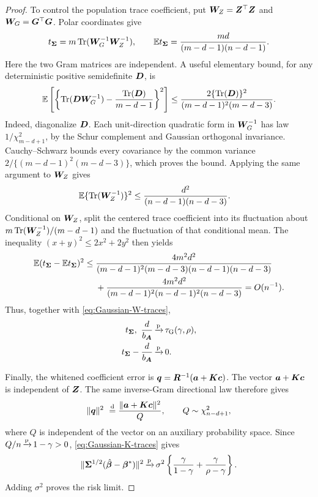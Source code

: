 \documentclass{article}
\theoremstyle{plain} %
\theoremstyle{definition} %
\theoremstyle{definition} %
\begin{document}
\begin{proof}
To control the population trace coefficient, put
$\boldsymbol{W}_Z=\boldsymbol{Z}^\top\boldsymbol{Z}$ and $\boldsymbol{W}_G=\boldsymbol{G}^\top\boldsymbol{G}$. Polar coordinates give
\begin{align*}
    t_{\boldsymbol{\Sigma}}=m\operatorname{Tr}(\boldsymbol{W}_G^{-1}\boldsymbol{W}_Z^{-1}),
    \qquad
    {\mathbb{E}} t_{\boldsymbol{\Sigma}}=\frac{md}{(m-d-1)(n-d-1)}.
\end{align*}
Here the two Gram matrices are independent. A useful elementary bound,
for any deterministic positive semidefinite $\boldsymbol{D}$, is
\begin{align*}
    {\mathbb{E}}\left[
      \left\{\operatorname{Tr}(\boldsymbol{D}\boldsymbol{W}_G^{-1})-
             \frac{\operatorname{Tr}(\boldsymbol{D})}{m-d-1}\right\}^2\right]
    \leq\frac{2\{\operatorname{Tr}(\boldsymbol{D})\}^2}{(m-d-1)^2(m-d-3)}.
\end{align*}
Indeed, diagonalize $\boldsymbol{D}$. Each unit-direction quadratic form in
$\boldsymbol{W}_G^{-1}$ has law $1/\chi^2_{m-d+1}$, by the Schur complement and
Gaussian orthogonal invariance. Cauchy--Schwarz bounds every covariance
by the common variance $2/\{(m-d-1)^2(m-d-3)\}$, which proves the bound.
Applying the same argument to $\boldsymbol{W}_Z$ gives
\begin{align*}
    {\mathbb{E}}\{\operatorname{Tr}(\boldsymbol{W}_Z^{-1})\}^2
       &\leq\frac{d^2}{(n-d-1)(n-d-3)}.
\end{align*}
Conditional on $\boldsymbol{W}_Z$, split the centered trace coefficient into
its fluctuation about $m\operatorname{Tr}(\boldsymbol{W}_Z^{-1})/(m-d-1)$ and the fluctuation
of that conditional mean. The inequality $(x+y)^2\leq2x^2+2y^2$ then yields
\begin{align*}
    {\mathbb{E}}(t_{\boldsymbol{\Sigma}}-{\mathbb{E}} t_{\boldsymbol{\Sigma}})^2
    \leq{}&
    \frac{4m^2d^2}
    {(m-d-1)^2(m-d-3)(n-d-1)(n-d-3)}\\
    &+\frac{4m^2d^2}
    {(m-d-1)^2(n-d-1)^2(n-d-3)}=O(n^{-1}).
\end{align*}
Thus, together with \eqref{eq:Gaussian-W-traces},
\begin{align}
    t_{\boldsymbol{\Sigma}},\ \frac{d}{b_{\boldsymbol{A}}}
    &{\,\smash{\xrightarrow{\mathrm{p}}}}\,\tau_{\rm G}(\gamma,\rho),\notag\\
    t_{\boldsymbol{\Sigma}}-\frac{d}{b_{\boldsymbol{A}}}&{\,\smash{\xrightarrow{\mathrm{p}}}}\,0.
    \label{eq:Gaussian-trace-limits}
\end{align}

Finally, the whitened coefficient error is
$\boldsymbol{q}=\boldsymbol{R}^{-1}(\boldsymbol{a}+\boldsymbol{K}\boldsymbol{c})$. The vector $\boldsymbol{a}+\boldsymbol{K}\boldsymbol{c}$ is independent
of $\boldsymbol{Z}$. The same inverse-Gram directional law therefore gives
\begin{align*}
    \lVert\boldsymbol{q}\rVert^2
       \ \stackrel{\rm d}{=}
       \frac{\lVert\boldsymbol{a}+\boldsymbol{K}\boldsymbol{c}\rVert^2}{Q},
    \qquad Q\sim\chi^2_{n-d+1},
\end{align*}
where $Q$ is independent of the vector on an auxiliary probability space.
Since $Q/n{\,\smash{\xrightarrow{\mathrm{p}}}}\,1-\gamma>0$, \eqref{eq:Gaussian-K-traces} gives
\begin{align*}
    \lVert\boldsymbol{\Sigma}^{1/2}(\hat{\boldsymbol{\beta}}{}-\boldsymbol{\beta}^*)\rVert^2
    {\,\smash{\xrightarrow{\mathrm{p}}}}\,\sigma^2\left\{
       \frac{\gamma}{1-\gamma}+\frac{\gamma}{\rho-\gamma}\right\}.
\end{align*}
Adding $\sigma^2$ proves the risk limit.


\end{proof}
\end{document}
